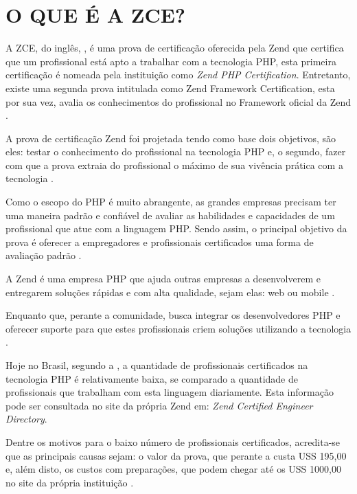 \chapter{O QUE É A ZCE?}
\label{zce}

A ZCE, do inglês, \textit{\ZCE}, é uma prova de certificação oferecida
pela Zend que certifica que um profissional está apto a trabalhar com a tecnologia PHP, 
esta primeira certificação é nomeada pela instituição como \textit{Zend PHP
Certification}. Entretanto, existe uma segunda prova intitulada como Zend
Framework Certification, esta por sua vez, avalia os conhecimentos do profissional 
no Framework oficial da Zend \cite{websiteZendZce}. 

A prova de certificação Zend foi projetada tendo como base dois objetivos, são
eles: testar o conhecimento do profissional na tecnologia PHP e, o segundo, fazer 
com que a prova extraia do profissional o máximo de sua vivência prática com a 
tecnologia \cite{theZendPHPCertificationPracticeTestBook}.

Como o escopo do PHP é muito abrangente, as grandes empresas precisam ter uma
maneira padrão e confiável de avaliar as habilidades e capacidades de um profissional 
que atue com a linguagem PHP. Sendo assim, o principal objetivo da prova é oferecer a 
empregadores e profissionais certificados uma forma de avaliação padrão
\cite{zendPhp5CertificationStudyGuide}.

A Zend é uma empresa PHP que ajuda outras empresas a desenvolverem e entregarem
soluções rápidas e com alta qualidade, sejam elas: web ou mobile \cite{websiteZendCompany}.

Enquanto que, perante a comunidade, busca integrar os desenvolvedores PHP e
oferecer suporte para que estes profissionais criem soluções utilizando a tecnologia \cite{websiteZendCompany}.

Hoje no Brasil, segundo a , a quantidade de profissionais
certificados na tecnologia PHP é relativamente baixa, se comparado a quantidade 
de profissionais que trabalham com esta linguagem diariamente. Esta informação 
pode ser consultada no site da própria Zend em: \textit{Zend Certified Engineer
Directory}.

Dentre os motivos para o baixo número de profissionais certificados, acredita-se
que as principais causas sejam: o valor da prova, que perante a 
 custa USS 195,00 e, além disto, os custos com preparações, que podem chegar até
 os USS 1000,00 no site da própria instituição \cite{websiteZendOnlineTraining}.
